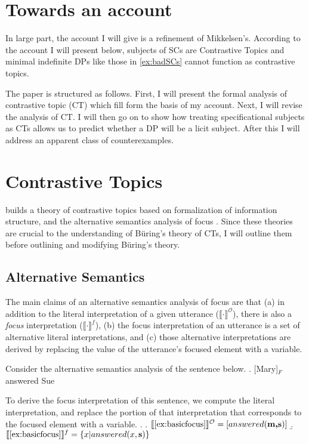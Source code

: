 \documentclass[letterpaper]{article}
\begin{document}
\section{Towards an account}
In large part, the account I will give is a refinement of Mikkelsen's.
According to the account I will present below, subjects of SCs are Contrastive Topics \parencite[in the sense of][]{buring2003d} and minimal indefinite DPs like those in \ref{ex:badSCs} cannot function as contrastive topics.

The paper is structured as follows.
First, I will present the formal analysis of contrastive topic (CT) which fill form the basis of my account.
Next, I will revise the analysis of CT.
I will then go on to show how treating specificational subjects as CTs allows us to predict whether a DP will be a licit subject.
After this I will address an apparent class of counterexamples.

\section{Contrastive Topics}
\textcite{buring2003d} builds a theory of contrastive topics based on  formalization of information structure, and the alternative semantics analysis of focus \parencite{rooth1992theory}.
Since these theories are crucial to the understanding of B\"uring's theory of CTs, I will outline them before outlining and modifying B\"uring's theory.

\subsection{Alternative Semantics}
The main claims of an alternative semantics analysis of focus are that (a) in addition to the literal interpretation of a given utterance ($\llbracket \cdot \rrbracket^\mathcal{O}$), there is also a \textit{focus} interpretation ($\llbracket \cdot \rrbracket^f$), (b) the focus interpretation of an utterance is a set of alternative literal interpretations, and (c) those alternative interpretations are derived by replacing the value of the utterance's focused element with a variable.

Consider the alternative semantics analysis of the sentence below.
\ex.\label{ex:basicfocus} [Mary]$_F$ answered Sue

To derive the focus interpretation of this sentence, we compute the literal interpretation, and replace the portion of that interpretation that corresponds to the focused element with a variable.
\ex.
\a. $\llbracket \text{\ref{ex:basicfocus}}\rrbracket^\mathcal{O} = [answered(\textbf{m,s})]$
\b. $\llbracket \text{\ref{ex:basicfocus}}\rrbracket^f = \left\{ x | answered(x,\textbf{s}) \right\}$
\end{document}
